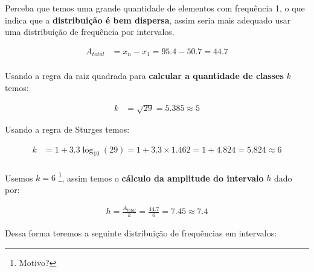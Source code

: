 \begin{parts}
\begin{solution}
        Perceba que temos uma grande quantidade de elementos com frequência 1, o que indica que a \textbf{distribuição é bem dispersa}, assim seria mais adequado usar uma distribuição de frequência por intervalos.

        \begin{equation*}
            \begin{split}
                A_{total} & = x_n - x_1 = 95.4 - 50.7 = 44.7 \\
            \end{split}
        \end{equation*}

        Usando a regra da raiz quadrada para \textbf{calcular a quantidade de classes} $k$ temos:

        \begin{equation*}
            \begin{split}
                k & = \sqrt{29} = 5.385 \approx 5
            \end{split}
        \end{equation*}

        Usando a regra de Sturges temos:

        \begin{equation*}
            \begin{split}
                k & = 1 + 3.3 \log_{10}(29) = 1 + 3.3 \times 1.462 = 1 + 4.824 = 5.824 \approx 6 \\
            \end{split}
        \end{equation*}

        \pagebreak

        Usemos $k = 6$ \footnote{Motivo?}, assim temos o \textbf{cálculo da amplitude do intervalo} $h$ dado por:

        \begin{equation*}
            \begin{split}
                h = \frac{A_{total}}{k} = \frac{44.7}{6} = 7.45 \approx 7.4
            \end{split}
        \end{equation*}

        Dessa forma teremos a seguinte distribuição de frequências em intervalos:


\end{solution}
\end{parts}

